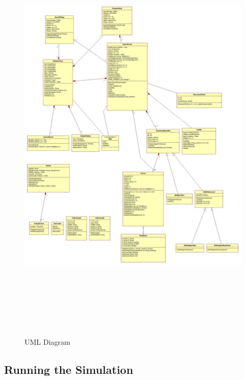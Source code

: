 \begin{figure}
\centering
\caption{UML Diagram}
\includegraphics[height = 20cm]{pics/Main.jpg}\\[0.5cm]    
\end{figure}

\subsection{Running the Simulation}

